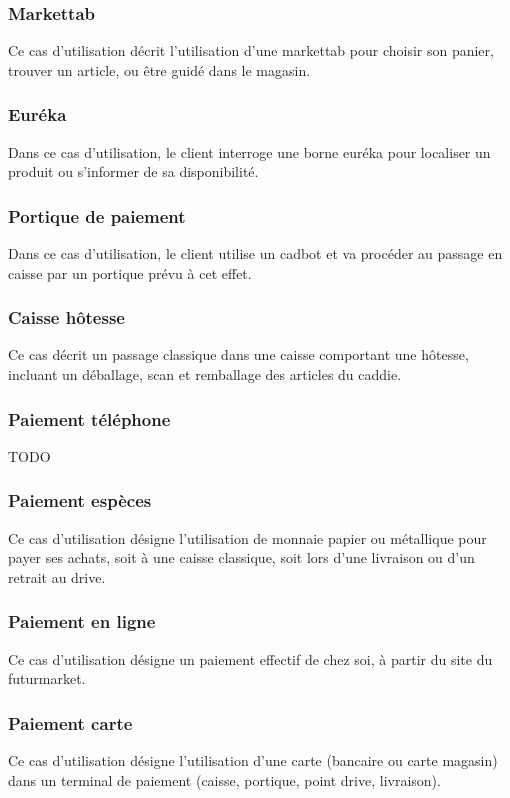 \subsubsection{Markettab}
Ce cas d'utilisation décrit l'utilisation d'une markettab pour choisir son panier, trouver un article, ou être guidé dans le magasin.

\subsubsection{Euréka}
Dans ce cas d'utilisation, le client interroge une borne euréka pour localiser un produit ou s'informer de sa disponibilité.

\subsubsection{Portique de paiement}
Dans ce cas d'utilisation, le client utilise un cadbot et va procéder au passage en caisse par un portique prévu à cet effet. 

\subsubsection{Caisse hôtesse}
Ce cas décrit un passage classique dans une caisse comportant une hôtesse, incluant un déballage, scan et remballage des articles du caddie.

\subsubsection{Paiement téléphone}
TODO

\subsubsection{Paiement espèces}
Ce cas d'utilisation désigne l'utilisation de monnaie papier ou métallique pour payer ses achats, soit à une caisse classique, soit lors d'une livraison ou d'un retrait au drive.

\subsubsection{Paiement en ligne}
Ce cas d'utilisation désigne un paiement effectif de chez soi, à partir du site du futurmarket.

\subsubsection{Paiement carte}
Ce cas d'utilisation désigne l'utilisation d'une carte (bancaire ou carte magasin) dans un terminal de paiement (caisse, portique, point drive, livraison).

